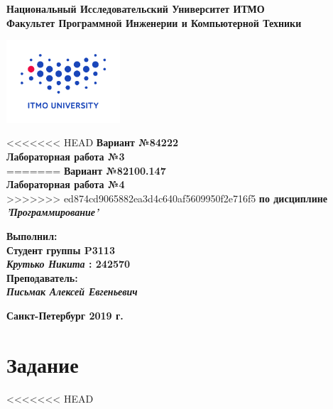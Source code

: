 \documentclass[11pt]{article}
\author{Krutko Nikita / KrutNA}
\date{\today}
\title{}
\begin{document}
\large
\thispagestyle{empty}
\begin{center}
\textbf{Национальный Исследовательский Университет ИТМО}\\
\textbf{Факультет Программной Инженерии и Компьютерной Техники}\\
\end{center}
\vspace{2em}
\begin{center}
\includegraphics[width=120pt]{itmo-logo.png}
\end{center}
\LARGE
\vspace{5em}
\begin{center}
<<<<<<< HEAD
\textbf{Вариант №84222}\\
\textbf{Лабораторная работа №3}\\
=======
\textbf{Вариант №82100.147}\\
\textbf{Лабораторная работа №4}\\
>>>>>>> ed874cd9065882ea3d4c640af5609950f2e716f5
\Large
\textbf{по дисциплине}\\
\LARGE
\textbf{\emph{'Программирование'}}\\
\end{center}
\vspace{11em}
\large
\begin{flushright}
\textbf{Выполнил:}\\
\textbf{Студент группы P3113}\\
\textbf{\emph{Крутько Никита} : 242570}\\
\textbf{Преподаватель:}\\
\textbf{\emph{Письмак Алексей Евгеньевич}}\\
\end{flushright}
\vspace{4em}
\large
\begin{center}
\textbf{Санкт-Петербург 2019 г.}
\end{center}
\pagebreak{}
\setcounter{tocdepth}{2}
\tableofcontents
\vspace{2em}
\section{Задание}
<<<<<<< HEAD
\label{sec:org5ce9b12}
\end{document}
